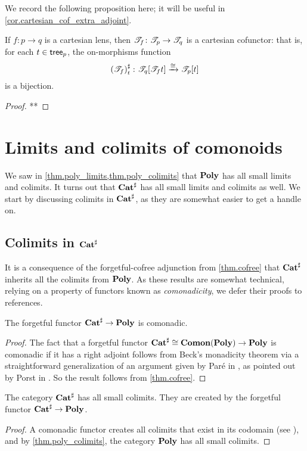 \documentclass[Book-Poly]{subfiles}
\begin{document}
We record the following proposition here; it will be useful in \cref{cor.cartesian_cof_extra_adjoint}.

\begin{proposition}
If $f\colon p\to q$ is a cartesian lens, then $\mathscr{T}_{f}\colon\mathscr{T}_{p}\to\mathscr{T}_{q}$ is a cartesian cofunctor: that is, for each $t\in\mathsf{tree}_p$, the on-morphisms function
\[
    \left(\mathscr{T}_{f}\right)^\sharp_t\colon\mathscr{T}_{q}[\mathscr{T}_{f}t]\xrightarrow{\cong}\mathscr{T}_{p}[t]
\]
is a bijection.
\end{proposition}
\begin{proof}
**
\end{proof}

\section{Limits and colimits of comonoids}

We saw in \cref{thm.poly_limits,thm.poly_colimits} that $\mathbf{Poly}$ has all small limits and colimits.
It turns out that $\mathbf{Cat}^\sharp$ has all small limits and colimits as well.
We start by discussing colimits in $\mathbf{Cat}^\sharp$, as they are somewhat easier to get a handle on.

\subsection{Colimits in $\mathbf{Cat}^\sharp$}

It is a consequence of the forgetful-cofree adjunction from \cref{thm.cofree} that $\mathbf{Cat}^\sharp$ inherits all the colimits from $\mathbf{Poly}$.
As these results are somewhat technical, relying on a property of functors known as \emph{comonadicity}, we defer their proofs to references.

\begin{proposition}[Porst]
The forgetful functor $\mathbf{Cat}^\sharp\to\mathbf{Poly}$ is comonadic.
\end{proposition}
\begin{proof}
The fact that a forgetful functor $\mathbf{Cat}^\sharp\cong\mathbf{Comon}(\mathbf{Poly})\to\mathbf{Poly}$ is comonadic if it has a right adjoint follows from Beck's monadicity theorem via a straightforward generalization of an argument given by Par{\'e} in \cite[pp.~138-9]{pare1969absolute}, as pointed out by Porst in \cite[Fact~3.1]{porst2019colimits}.
So the result follows from \cref{thm.cofree}.
\end{proof}

\begin{corollary} \label{cor.comon_cocomp}
The category $\mathbf{Cat}^\sharp$ has all small colimits.
They are created by the forgetful functor $\mathbf{Cat}^\sharp\to\mathbf{Poly}$.
\end{corollary}
\begin{proof}
A comonadic functor creates all colimits that exist in its codomain (see \cite{nlab:created-limit}), and by \cref{thm.poly_colimits}, the category $\mathbf{Poly}$ has all small colimits.
\end{proof}
\end{document}
